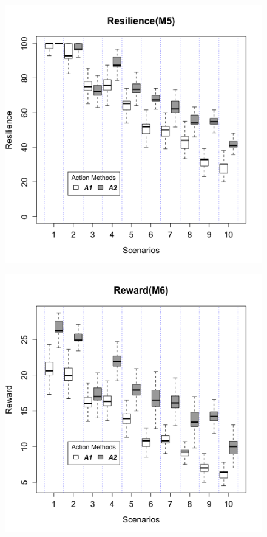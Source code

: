 \begin{figure}
\centering
\begin{minipage}{.5\textwidth}
  \centering
  \includegraphics[width=0.95\linewidth]{img/graphs/Boxplot_M5.png}
  \label{fig:m5}
\end{minipage}%
\begin{minipage}{.5\textwidth}
  \centering
  \includegraphics[width=0.95\linewidth]{img/graphs/Boxplot_M6.png}
  \label{fig:m6}
\end{minipage}
\end{figure}

